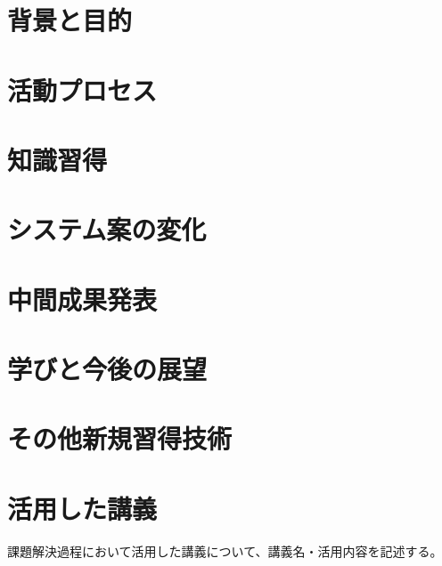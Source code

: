 \documentclass[openany,11pt,papersize]{jsbook}
\begin{document}
%
\maketitle

\frontmatter



\tableofcontents%


\mainmatter%

\chapter{背景と目的}



\chapter{活動プロセス}



\chapter{知識習得}



\chapter{システム案の変化}



\chapter{中間成果発表}



\chapter{学びと今後の展望}



\begin{appendix}

\chapter{その他新規習得技術}


\chapter{活用した講義}
\begin{hissu}
課題解決過程において活用した講義について、講義名・活用内容を記述する。
\end{hissu}

\end{appendix}
\end{document}
